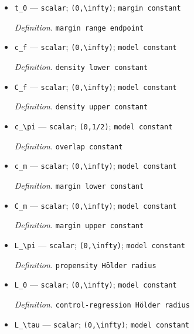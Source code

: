 \documentclass{article}
\begin{document}
\begin{itemize}
  \par\smallskip\noindent\emph{Definition.} \texttt{threshold-\allowbreak{}band width}
  \item \texttt{t\_\allowbreak{}0} --- \texttt{scalar}; \texttt{(0,\allowbreak{}\textbackslash{}\allowbreak{}infty)}; \texttt{margin constant}
  \par\smallskip\noindent\emph{Definition.} \texttt{margin range endpoint}
  \item \texttt{c\_\allowbreak{}f} --- \texttt{scalar}; \texttt{(0,\allowbreak{}\textbackslash{}\allowbreak{}infty)}; \texttt{model constant}
  \par\smallskip\noindent\emph{Definition.} \texttt{density lower constant}
  \item \texttt{C\_\allowbreak{}f} --- \texttt{scalar}; \texttt{(0,\allowbreak{}\textbackslash{}\allowbreak{}infty)}; \texttt{model constant}
  \par\smallskip\noindent\emph{Definition.} \texttt{density upper constant}
  \item \texttt{c\_\allowbreak{}\textbackslash{}\allowbreak{}pi} --- \texttt{scalar}; \texttt{(0,\allowbreak{}1/\allowbreak{}2)}; \texttt{model constant}
  \par\smallskip\noindent\emph{Definition.} \texttt{overlap constant}
  \item \texttt{c\_\allowbreak{}m} --- \texttt{scalar}; \texttt{(0,\allowbreak{}\textbackslash{}\allowbreak{}infty)}; \texttt{model constant}
  \par\smallskip\noindent\emph{Definition.} \texttt{margin lower constant}
  \item \texttt{C\_\allowbreak{}m} --- \texttt{scalar}; \texttt{(0,\allowbreak{}\textbackslash{}\allowbreak{}infty)}; \texttt{model constant}
  \par\smallskip\noindent\emph{Definition.} \texttt{margin upper constant}
  \item \texttt{L\_\allowbreak{}\textbackslash{}\allowbreak{}pi} --- \texttt{scalar}; \texttt{(0,\allowbreak{}\textbackslash{}\allowbreak{}infty)}; \texttt{model constant}
  \par\smallskip\noindent\emph{Definition.} \texttt{propensity Hölder radius}
  \item \texttt{L\_\allowbreak{}0} --- \texttt{scalar}; \texttt{(0,\allowbreak{}\textbackslash{}\allowbreak{}infty)}; \texttt{model constant}
  \par\smallskip\noindent\emph{Definition.} \texttt{control-\allowbreak{}regression Hölder radius}
  \item \texttt{L\_\allowbreak{}\textbackslash{}\allowbreak{}tau} --- \texttt{scalar}; \texttt{(0,\allowbreak{}\textbackslash{}\allowbreak{}infty)}; \texttt{model constant}

\end{itemize}
\end{document}

